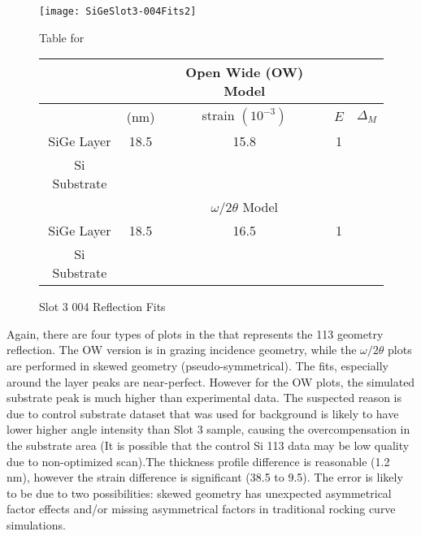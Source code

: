 \begin{figure}[ht]%
\caption{Slot 3 004 Reflection Fits}
\label{Slot3-004}
\begin{minipage}{0.85\linewidth}
\texttt{[image: SiGeSlot3-004Fits2]}
\end{minipage}
\begin{minipage}{\linewidth}
\centering
\vspace{10pt}
Table for \\
\vspace{5pt}
\begin{tabular}{c|cccc}
\hline
&&{Open Wide (OW) Model}	 \\
\hline
			&	(nm)	&	strain  $(10^{-3})$	&	$E$&  $\Delta_M$\\
\hline
SiGe Layer		&  	18.5	&     15.8	 & 1 & \textendash	\\
Si Substrate		&	\textemdash & \textemdash&\textemdash\ &\textemdash	\\
\hline
			& &$\omega/2\theta$ Model \\
\hline
SiGe Layer		&	18.5	& 16.5	& 1	&\textendash\ 	\\
Si Substrate		&	\textemdash & \textemdash&\textemdash\ &\textemdash
\end{tabular}
\end{minipage}
\end{figure}

Again,  there are four types of plots in the  that represents the 113 geometry reflection.  The OW version is in grazing incidence geometry, while the $\omega/2\theta$ plots are performed in skewed geometry (pseudo-symmetrical).  The fits, especially around the layer peaks are near-perfect.  However for the OW plots, the simulated substrate peak is much higher than experimental data.  The suspected reason is due to control substrate dataset that was used for background is likely to have lower higher angle intensity than Slot 3 sample, causing the overcompensation in the substrate area (It is possible that the control Si 113 data may be low quality due to non-optimized scan).The thickness profile difference is reasonable (1.2 nm), however the strain difference is significant (38.5 to 9.5).  The error is likely to be due to two possibilities:  skewed geometry has unexpected asymmetrical factor effects and/or missing asymmetrical factors in traditional rocking curve simulations.

